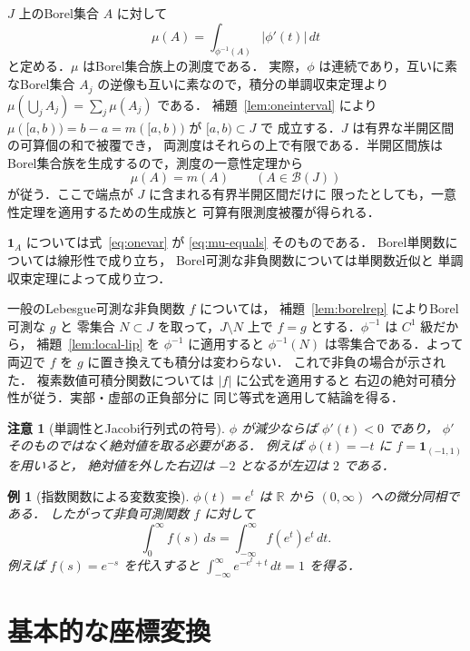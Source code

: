 \documentclass[a5paper,10pt,onecolumn]{jsarticle}
\makeatletter
\theoremstyle{mathnotetheorem}
\newtheorem{example}[theorem]{例}
\newtheorem{remark}[theorem]{注意}
\renewcommand{\proofname}{証明}
\renewenvironment{proof}[1][\proofname]{%
  \par\pushQED{\qed}\normalfont\topsep4\p@\@plus2\p@\relax
  \trivlist\item[\hskip\labelsep\bfseries #1]\ignorespaces
}{\popQED\endtrivlist\@endpefalse}
\newcommand{\R}{\mathbb{R}}
\newcommand{\abs}[1]{\lvert #1\rvert}
\makeatother
\begin{document}
\begin{proof}
$J$ 上のBorel集合 $A$ に対して
\[
 \mu(A)=\int_{\phi^{-1}(A)}\abs{\phi'(t)}\,dt
\]
と定める．$\mu$ はBorel集合族上の測度である．
実際，$\phi$ は連続であり，互いに素なBorel集合
$A_j$ の逆像も互いに素なので，積分の単調収束定理より
$\mu(\bigcup_j A_j)=\sum_j\mu(A_j)$ である．
補題~\ref{lem:oneinterval} により
$\mu([a,b))=b-a=m([a,b))$ が $[a,b)\subset J$ で
成立する．$J$ は有界な半開区間の可算個の和で被覆でき，
両測度はそれらの上で有限である．半開区間族は
Borel集合族を生成するので，測度の一意性定理から
\begin{equation}\label{eq:mu-equals}
 \mu(A)=m(A)\qquad(A\in\mathcal B(J))
\end{equation}
が従う．ここで端点が $J$ に含まれる有界半開区間だけに
限ったとしても，一意性定理を適用するための生成族と
可算有限測度被覆が得られる．

$\mathbf1_A$ については式~\eqref{eq:onevar} が
\eqref{eq:mu-equals} そのものである．
Borel単関数については線形性で成り立ち，
Borel可測な非負関数については単関数近似と
単調収束定理によって成り立つ．

一般のLebesgue可測な非負関数 $f$ については，
補題~\ref{lem:borelrep} によりBorel可測な $g$ と
零集合 $N\subset J$ を取って，$J\setminus N$ 上で
$f=g$ とする．$\phi^{-1}$ は $C^1$ 級だから，
補題~\ref{lem:local-lip} を $\phi^{-1}$ に適用すると
$\phi^{-1}(N)$ は零集合である．よって両辺で
$f$ を $g$ に置き換えても積分は変わらない．
これで非負の場合が示された．
複素数値可積分関数については $\abs f$ に公式を適用すると
右辺の絶対可積分性が従う．実部・虚部の正負部分に
同じ等式を適用して結論を得る．
\end{proof}

\begin{remark}[単調性とJacobi行列式の符号]
$\phi$ が減少ならば $\phi'(t)<0$ であり，
$\phi'$ そのものではなく絶対値を取る必要がある．
例えば $\phi(t)=-t$ に $f=\mathbf1_{(-1,1)}$ を用いると，
絶対値を外した右辺は $-2$ となるが左辺は $2$ である．
\end{remark}

\begin{example}[指数関数による変数変換]
$\phi(t)=e^t$ は $\R$ から $(0,\infty)$ への微分同相である．
したがって非負可測関数 $f$ に対して
\[
 \int_0^{\infty}f(s)\,ds
 =\int_{-\infty}^{\infty}f(e^t)e^t\,dt.
\]
例えば $f(s)=e^{-s}$ を代入すると
$\int_{-\infty}^{\infty}e^{-e^t+t}\,dt=1$ を得る．
\end{example}

\section{基本的な座標変換}\label{sec:elementary}
\end{document}
